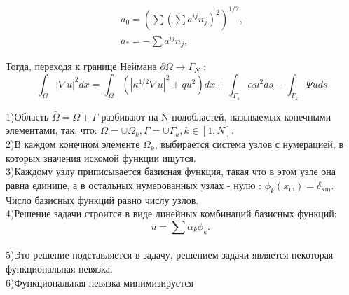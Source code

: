 \documentclass[a4paper, 12pt]{article}%
\begin{document}
	$$
	\begin{gathered}
		a_0=\left(\sum\left(\sum a^{i j} n_j\right)^2\right)^{1 / 2}, \\
		a_*=-\sum a^{i j} n_j,
	\end{gathered}
	$$
	
	Тогда, переходя к границе Неймана $\partial \Omega \rightarrow \Gamma_N$ :
	$$
	\int_{\Omega}|\nabla u|^2 d x=\int_{\Omega}\left(\left|\kappa^{1 / 2} \nabla u\right|^2+q u^2\right) d x+\int_{\Gamma_s} \alpha u^2 d s-\int_{\Gamma_\kappa} \Psi u d s
	$$


	1)Область $\bar{\Omega}=\Omega+\Gamma$ разбивают на $\mathrm{N}$ подобластей, называемых конечными элементами, так, что: $\Omega=\cup \Omega_k, \Gamma=\cup \Gamma_k, k \in[1, N]$.\\
	2)В каждом конечном элементе $\overline{\Omega_k}$, выбирается система узлов с нумерацией, в которых значения искомой функции ищутся.\\
	3)Каждому узлу приписывается базисная функция, такая что в этом узле она равна единице, а в остальных нумерованных узлах - нулю : $\phi_k\left(x_{\mathrm{m}}\right)=\delta_{\mathrm{km}}$. Число базисных функций равно числу узлов.\\
	4)Решение задачи строится в виде линейных комбинаций базисных функций:
	$$
	u=\sum \alpha_k \phi_k \text {. }
	$$\\
	5)Это решение подставляется в задачу, решением задачи является некоторая функциональная невязка.\\
	6)Функциональная невязка минимизируется\\
	
	
	
	
	
\end{document}
